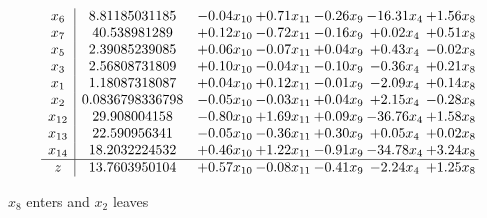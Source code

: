 \documentclass[9pt]{article}
\begin{document}
 \[\begin{array}{c| c c@{\hskip 2pt} c@{\hskip 2pt} c@{\hskip 2pt} c@{\hskip 2pt} c@{\hskip 2pt} }
 x_{6}   &  8.81185031185 & -0.04 x_{10} & +  0.71 x_{11} & -0.26 x_{9} & -16.31 x_{4} & +  1.56 x_{8}\\
 x_{7}   &  40.538981289 & +  0.12 x_{10} & -0.72 x_{11} & -0.16 x_{9} & +  0.02 x_{4} & +  0.51 x_{8}\\
 x_{5}   &  2.39085239085 & +  0.06 x_{10} & -0.07 x_{11} & +  0.04 x_{9} & +  0.43 x_{4} & -0.02 x_{8}\\
 x_{3}   &  2.56808731809 & +  0.10 x_{10} & -0.04 x_{11} & -0.10 x_{9} & -0.36 x_{4} & +  0.21 x_{8}\\
 x_{1}   &  1.18087318087 & +  0.04 x_{10} & +  0.12 x_{11} & -0.01 x_{9} & -2.09 x_{4} & +  0.14 x_{8}\\
 x_{2}   &  0.0836798336798 & -0.05 x_{10} & -0.03 x_{11} & +  0.04 x_{9} & +  2.15 x_{4} & -0.28 x_{8}\\
 x_{12}   &  29.908004158 & -0.80 x_{10} & +  1.69 x_{11} & +  0.09 x_{9} & -36.76 x_{4} & +  1.58 x_{8}\\
 x_{13}   &  22.590956341 & -0.05 x_{10} & -0.36 x_{11} & +  0.30 x_{9} & +  0.05 x_{4} & +  0.02 x_{8}\\
 x_{14}   &  18.2032224532 & +  0.46 x_{10} & +  1.22 x_{11} & -0.91 x_{9} & -34.78 x_{4} & +  3.24 x_{8}\\
\hline
z    &  13.7603950104 & +  0.57 x_{10} & -0.08 x_{11} & -0.41 x_{9} & -2.24 x_{4} & +  1.25 x_{8}\\
\end{array}\]


 $ x_{8} $ enters and $ x_{2} $ leaves 
\end{document}
